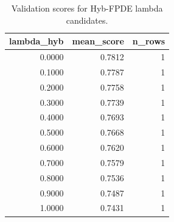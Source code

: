 \begin{table}[t]
\caption{Validation scores for Hyb-FPDE lambda candidates.}
\label{tab:lambda_distribution_computed}
\centering
\begin{tabular}{rrr}
\toprule
lambda\_hyb & mean\_score & n\_rows \\
\midrule
0.0000 & 0.7812 & 1 \\
0.1000 & 0.7787 & 1 \\
0.2000 & 0.7758 & 1 \\
0.3000 & 0.7739 & 1 \\
0.4000 & 0.7693 & 1 \\
0.5000 & 0.7668 & 1 \\
0.6000 & 0.7620 & 1 \\
0.7000 & 0.7579 & 1 \\
0.8000 & 0.7536 & 1 \\
0.9000 & 0.7487 & 1 \\
1.0000 & 0.7431 & 1 \\
\bottomrule
\end{tabular}

\end{table}
